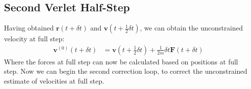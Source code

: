 \subsection{Second Verlet Half-Step}
\label{sec:rattle-verlet-2}
\par Having obtained $\mathbf{r}(t + \delta t)$ and $\mathbf{v}(t + \frac{1}{2} \delta t)$, we can obtain the unconstrained velocity at full step:
\begin{equation}
\label{eq:rattle-verlet-1}
\begin{aligned}
\mathbf{v}^{(0)}(t + \delta t) &= \mathbf{v}(t + \frac{1}{2} \delta t) + \frac{1}{2m} \delta t \mathbf{F}(t + \delta t)
\end{aligned}
\end{equation}
Where the forces at full step can now be calculated based on positions at full step. Now we can begin the second correction loop, to correct the unconstrained estimate of velocities at full step.